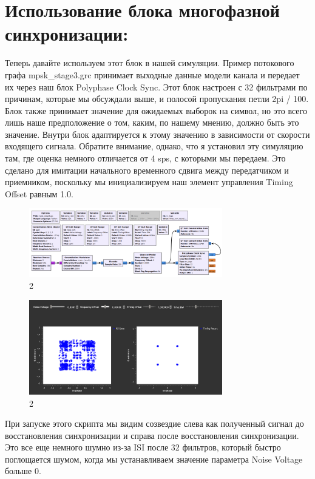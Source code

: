 \documentclass[10pt,a4paper,oneside]{article}
\begin{document}
\section{Использование блока многофазной синхронизации:}

Теперь давайте используем этот блок в нашей симуляции. Пример потокового графа mpsk_stage3.grc принимает выходные данные модели канала и передает их через наш блок Polyphase Clock Sync. Этот блок настроен с 32 фильтрами по причинам, которые мы обсуждали выше, и полосой пропускания петли 2pi / 100. Блок также принимает значение для ожидаемых выборок на символ, но это всего лишь наше предположение о том, каким, по нашему мнению, должно быть это значение. Внутри блок адаптируется к этому значению в зависимости от скорости входящего сигнала. Обратите внимание, однако, что я установил эту симуляцию там, где оценка немного отличается от 4 sps, с которыми мы передаем. Это сделано для имитации начального временного сдвига между передатчиком и приемником, поскольку мы инициализируем наш элемент управления Timing Offset равным 1.0.

\begin{figure}[H]
        \centering
        \includegraphics[width=0.75\textwidth]{pics/15.png}
        \caption{2}
        \label{fig:first}
\end{figure}

\begin{figure}[H]
        \centering
        \includegraphics[width=0.75\textwidth]{pics/16.png}
        \caption{2}
        \label{fig:first}
\end{figure}

При запуске этого скрипта мы видим созвездие слева как полученный сигнал до восстановления синхронизации и справа после восстановления синхронизации. Это все еще немного шумно из-за ISI после 32 фильтров, который быстро поглощается шумом, когда мы устанавливаем значение параметра Noise Voltage больше 0.
\end{document}
